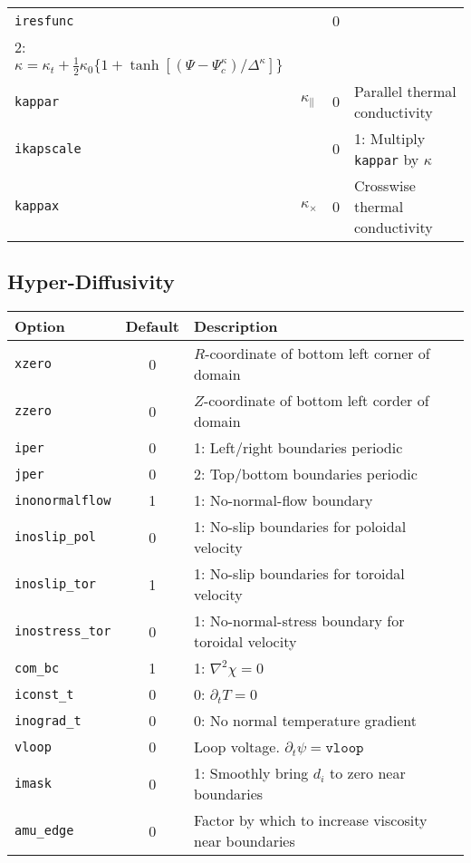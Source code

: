 \documentclass[letterpaper]{book}
\begin{document}
\begin{tabular}{llcp{2.25in}}
  \texttt{iresfunc} & & 0 &
  \begin{minipage}[t]{2.2in}
    0: $\kappa = \kappa_t + \kappa_0*p/T^{3/2}$\\
    2: $\kappa = \kappa_t + \frac{1}{2}\kappa_0 \{1 + \tanh[(\Psi - \Psi_c^{\kappa})/\Delta^{\kappa}]\}$
  \end{minipage}\\
  \texttt{kappar} & $\kappa_\parallel$ & 0 
                  & Parallel thermal conductivity\\
  \texttt{ikapscale}& & 0 & 1: Multiply \texttt{kappar} by $\kappa$\\
  \texttt{kappax} & $\kappa_\times$ & 0 
                  & Crosswise thermal conductivity\\ 
\end{tabular}

\subsection{Hyper-Diffusivity}

\begin{tabular}{lcp{2.2in}}
  \textbf{Option} & \textbf{Default} & \textbf{Description}\\
  \hline
  \texttt{xzero}  & 0 & $R$-coordinate of bottom left corner of domain\\
  \texttt{zzero}  & 0 & $Z$-coordinate of bottom left corder of domain\\
  \texttt{iper}   & 0 & 1: Left/right boundaries periodic\\
  \texttt{jper}   & 0 & 2: Top/bottom boundaries periodic\\
  \texttt{inonormalflow}& 1 & 1: No-normal-flow boundary\\
  \texttt{inoslip\_pol} & 0 & 1: No-slip boundaries for poloidal velocity\\
  \texttt{inoslip\_tor} & 1 & 1: No-slip boundaries for toroidal velocity\\
  \texttt{inostress\_tor}&0 & 1: No-normal-stress boundary for toroidal 
                                 velocity\\
  \texttt{com\_bc}& 1 & 1: $\nabla^2 \chi = 0$\\
  \texttt{iconst\_t}  & 0 & 0: $\partial_t T = 0$\\
  \texttt{inograd\_t} & 0 & 0: No normal temperature gradient\\
  \texttt{vloop}  & 0 & Loop voltage.  $\partial_t \psi = \mathtt{vloop}$\\
  \texttt{imask}  & 0 & 1: Smoothly bring $d_i$ to zero near
    boundaries\\
  \texttt{amu\_edge} & 0 &    Factor by which to increase viscosity near 
                              boundaries
\end{tabular}
\end{document}
